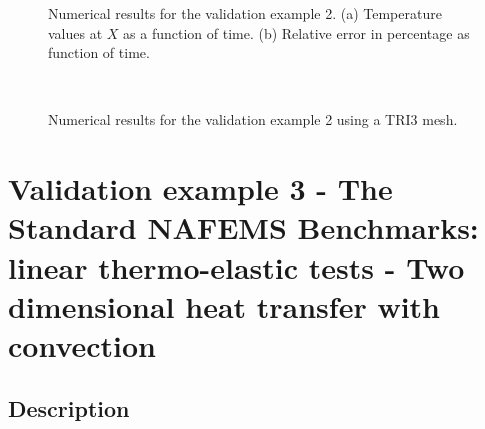 \begin{figure}
   \centering
    \caption{Numerical results for the validation example 2. (a) Temperature values at \(X\) as a function of time. (b) Relative error in percentage as function of time.}
    \label{fig:dim_example_2_comparison}
\end{figure}

\begin{figure}
   \centering
     \\
    \caption{Numerical results for the validation example 2 using a TRI3 mesh.}
    \label{fig:DIN_example_2_TRI3}
\end{figure}

\section{Validation example 3 - The Standard NAFEMS Benchmarks: linear thermo-elastic tests - Two dimensional heat transfer with convection}

\subsection{Description}

